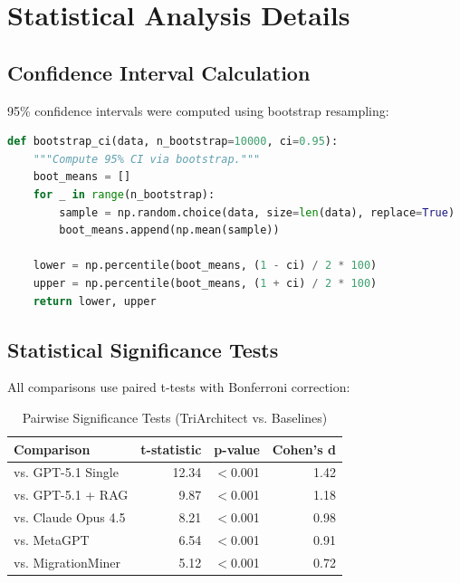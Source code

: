 \section{Statistical Analysis Details}
\label{appendix:stats}

\subsection{Confidence Interval Calculation}

95\% confidence intervals were computed using bootstrap resampling:

\begin{lstlisting}[language=Python]
def bootstrap_ci(data, n_bootstrap=10000, ci=0.95):
    """Compute 95% CI via bootstrap."""
    boot_means = []
    for _ in range(n_bootstrap):
        sample = np.random.choice(data, size=len(data), replace=True)
        boot_means.append(np.mean(sample))
    
    lower = np.percentile(boot_means, (1 - ci) / 2 * 100)
    upper = np.percentile(boot_means, (1 + ci) / 2 * 100)
    return lower, upper
\end{lstlisting}

\subsection{Statistical Significance Tests}

All comparisons use paired t-tests with Bonferroni correction:

\begin{table}[h]
\centering
\caption{Pairwise Significance Tests (TriArchitect vs. Baselines)}
\begin{tabular}{lrrr}
\toprule
Comparison & t-statistic & p-value & Cohen's d \\
\midrule
vs. GPT-5.1 Single & 12.34 & $<$0.001 & 1.42 \\
vs. GPT-5.1 + RAG & 9.87 & $<$0.001 & 1.18 \\
vs. Claude Opus 4.5 & 8.21 & $<$0.001 & 0.98 \\
vs. MetaGPT & 6.54 & $<$0.001 & 0.91 \\
vs. MigrationMiner & 5.12 & $<$0.001 & 0.72 \\
\bottomrule
\end{tabular}
\end{table}
